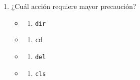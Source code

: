 \documentclass[
  spanish,
  letterpaper,
]{scrbook}
\providecommand{\tightlist}{%
  \setlength{\itemsep}{0pt}\setlength{\parskip}{0pt}}
\begin{document}
\begin{enumerate}
  \begin{itemize}
  \tightlist
  \item
    \begin{enumerate}
    \def\labelenumii{\alph{enumii})}
    \tightlist
    \item
      \texttt{mkdir}
    \end{enumerate}
  \item
    \begin{enumerate}
    \def\labelenumii{\alph{enumii})}
    \setcounter{enumii}{1}
    \tightlist
    \item
      \texttt{copy}
    \end{enumerate}
  \item
    \begin{enumerate}
    \def\labelenumii{\alph{enumii})}
    \setcounter{enumii}{2}
    \tightlist
    \item
      \texttt{type}
    \end{enumerate}
  \item
    \begin{enumerate}
    \def\labelenumii{\alph{enumii})}
    \setcounter{enumii}{3}
    \tightlist
    \item
      \texttt{cls}
    \end{enumerate}
  \end{itemize}
\item
  ¿Cuál acción requiere mayor precaución?

  \begin{itemize}
  \tightlist
  \item
    \begin{enumerate}
    \def\labelenumii{\alph{enumii})}
    \tightlist
    \item
      \texttt{dir}
    \end{enumerate}
  \item
    \begin{enumerate}
    \def\labelenumii{\alph{enumii})}
    \setcounter{enumii}{1}
    \tightlist
    \item
      \texttt{cd}
    \end{enumerate}
  \item
    \begin{enumerate}
    \def\labelenumii{\alph{enumii})}
    \setcounter{enumii}{2}
    \tightlist
    \item
      \texttt{del}
    \end{enumerate}
  \item
    \begin{enumerate}
    \def\labelenumii{\alph{enumii})}
    \setcounter{enumii}{3}
    \tightlist
    \item
      \texttt{cls}
    \end{enumerate}
  \end{itemize}
\end{enumerate}
\end{document}
